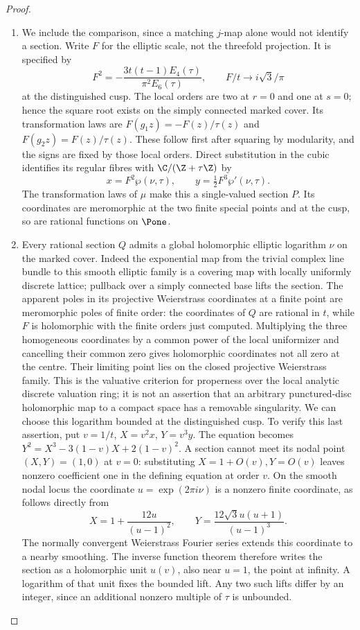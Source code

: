 \begin{proof}
\begin{enumerate}[label=\arabic*.,leftmargin=*]
\item We include the comparison, since a matching $j$-map alone would not
identify a section.  Write $F$ for the elliptic scale, not the
threefold projection.  It is specified by
\[
F^2=-\frac{3t(t-1)E_4(\tau)}{\pi^2E_6(\tau)},\qquad
F/t\longrightarrow i\sqrt3/\pi
\]
at the distinguished cusp.  The local orders are two at $r=0$ and
one at $s=0$; hence the square root exists on the simply connected
marked cover.  Its transformation laws are
$F(g_1z)=-F(z)/\tau(z)$ and $F(g_2z)=F(z)/\tau(z)$.
These follow first after squaring by modularity, and the signs are
fixed by those local orders.  Direct substitution in the cubic
identifies its regular fibres with $\C/(\Z+\tau\Z)$ by
\[
x=F^2\wp(\nu,\tau),\qquad y=\tfrac12F^3\wp'(\nu,\tau).
\]
The transformation laws of $\mu$ make this a single-valued section
$P$.  Its coordinates are meromorphic at the two finite special
points and at the cusp, so are rational functions on $\Pone$.

\item Every rational section $Q$ admits a global holomorphic elliptic
logarithm $\nu$ on the marked cover.  Indeed the exponential map
from the trivial complex line bundle to this smooth elliptic family
is a covering map with locally uniformly discrete lattice; pullback
over a simply connected base lifts the section.  The apparent poles
in its projective Weierstrass coordinates at a finite point are
meromorphic poles of finite order: the coordinates of $Q$ are
rational in $t$, while $F$ is holomorphic with the finite orders
just computed.  Multiplying the three homogeneous coordinates by
a common power of the local uniformizer and cancelling their
common zero gives holomorphic coordinates not all zero at the
centre.  Their limiting point lies on the closed projective
Weierstrass family.  This is the valuative criterion for properness
over the local analytic discrete valuation ring; it is not an
assertion that an arbitrary punctured-disc holomorphic map to a
compact space has a removable singularity.
We can choose this logarithm bounded at the distinguished cusp.
To verify this last assertion, put $v=1/t$, $X=v^2x$, $Y=v^3y$.
The equation becomes
$Y^2=X^3-3(1-v)X+2(1-v)^2$.  A section cannot meet its nodal point
$(X,Y)=(1,0)$ at $v=0$: substituting $X=1+O(v),Y=O(v)$ leaves
nonzero coefficient one in the defining equation at order $v$.
On the smooth nodal locus the coordinate
$u=\exp(2\pi i\nu)$ is a nonzero finite coordinate, as follows
directly from
\[
X=1+\frac{12u}{(u-1)^2},\qquad
Y=\frac{12\sqrt3u(u+1)}{(u-1)^3}.
\]
The normally convergent Weierstrass Fourier series extends this
coordinate to a nearby smoothing.  The inverse function theorem
therefore writes the section as a holomorphic unit $u(v)$, also
near $u=1$, the point at infinity.  A logarithm of that unit fixes
the bounded lift.  Any two such lifts differ by an integer, since
an additional nonzero multiple of $\tau$ is unbounded.


\end{enumerate}
\end{proof}
